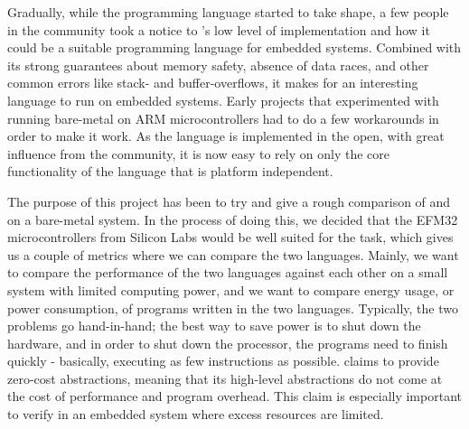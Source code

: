 Gradually, while the {\rust} programming language started to take shape, a few people in the community took a notice to {\rust}'s low level of implementation and how it could be a suitable programming language for embedded systems.
Combined with its strong guarantees about memory safety, absence of data races, and other common errors like stack- and buffer-overflows, it makes for an interesting language to run on embedded systems.
Early projects that experimented with running {\rust} bare-metal on ARM microcontrollers had to do a few workarounds in order to make it work.
As the language is implemented in the open, with great influence from the community, it is now easy to rely on only the core functionality of the language that is platform independent.

The purpose of this project has been to try and give a rough comparison of {\rust} and {\C} on a bare-metal system.
In the process of doing this, we decided that the EFM32 microcontrollers from Silicon Labs would be well suited for the task, which gives us a couple of metrics where we can compare the two languages.
Mainly, we want to compare the performance of the two languages against each other on a small system with limited computing power, and we want to compare energy usage, or power consumption, of programs written in the two languages.
Typically, the two problems go hand-in-hand; the best way to save power is to shut down the hardware, and in order to shut down the processor, the programs need to finish quickly - basically, executing as few instructions as possible.
{\rust} claims to provide zero-cost abstractions, meaning that its high-level abstractions do not come at the cost of performance and program overhead.
This claim is especially important to verify in an embedded system where excess resources are limited.







